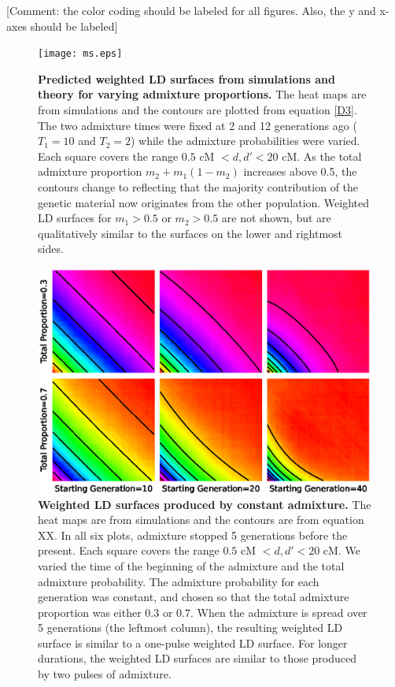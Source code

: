 [Comment: the color coding should be labeled for all figures.  Also, the y and x-axes should be labeled]

\begin{figure}
\texttt{[image: ms.eps]}
\caption{
{\bf Predicted weighted LD surfaces from simulations and theory for varying admixture proportions.} The heat maps are from simulations and the contours are plotted from equation \ref{D3}. The two admixture times were fixed at 2 and 12 generations ago ($T_1=10$ and $T_2=2$) while the admixture probabilities were varied. Each square covers the range $0.5 \text{ cM }<d,d'<20\text{ cM}$. As the total admixture proportion $m_2+m_1(1-m_2)$ increases above 0.5, the contours change to reflecting that the majority contribution of the genetic material now originates from the other population. Weighted LD surfaces for $m_1>0.5$ or $m_2>0.5$ are not shown, but are qualitatively similar to the surfaces on the lower and rightmost sides.
}
\label{ms}
\end{figure}

\begin{figure}
\includegraphics[scale=.8]{continuous.eps}
\caption{
{\bf Weighted LD surfaces produced by constant admixture.} The heat maps are from simulations and the contours are from equation XX. In all six plots, admixture stopped 5 generations before the present. Each square covers the range $0.5 \text{ cM }<d,d'<20\text{ cM}$. We varied the time of the beginning of the admixture and the total admixture probability. The admixture probability for each generation was constant, and chosen so that the total admixture proportion was either $0.3$ or $0.7$. When the admixture is spread over 5 generations (the leftmost column), the resulting weighted LD surface is similar to a one-pulse weighted LD surface. For longer durations, the weighted LD surfaces are similar to those produced by two pulses of admixture.
}
\label{continuous}
\end{figure}

